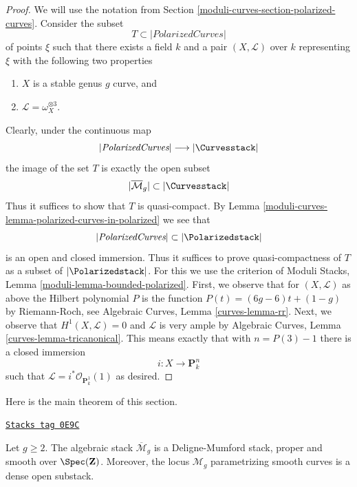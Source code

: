 \begin{proof}
We will use the notation from Section \ref{moduli-curves-section-polarized-curves}.
Consider the subset
$$
T \subset |\textit{PolarizedCurves}|
$$
of points $\xi$ such that there exists a field $k$ and a pair
$(X, \mathcal{L})$ over $k$ representing $\xi$
with the following two properties
\begin{enumerate}
\item $X$ is a stable genus $g$ curve, and
\item $\mathcal{L} = \omega_X^{\otimes 3}$.
\end{enumerate}
Clearly, under the continuous map
$$
|\textit{PolarizedCurves}|
\longrightarrow
|\Curvesstack|
$$
the image of the set $T$ is exactly the open subset
$$
|\overline{\mathcal{M}}_g| \subset |\Curvesstack|
$$
Thus it suffices to show that $T$ is quasi-compact.
By Lemma \ref{moduli-curves-lemma-polarized-curves-in-polarized} we see that
$$
|\textit{PolarizedCurves}| \subset |\Polarizedstack|
$$
is an open and closed immersion. Thus it suffices to
prove quasi-compactness of $T$ as a subset of
$|\Polarizedstack|$. For this we use the criterion of
Moduli Stacks, Lemma \ref{moduli-lemma-bounded-polarized}.
First, we observe that for $(X, \mathcal{L})$
as above the Hilbert polynomial $P$ is the function
$P(t) = (6g - 6)t + (1 - g)$ by Riemann-Roch, see
Algebraic Curves, Lemma \ref{curves-lemma-rr}.
Next, we observe that $H^1(X, \mathcal{L}) = 0$
and $\mathcal{L}$ is very ample by
Algebraic Curves, Lemma \ref{curves-lemma-tricanonical}.
This means exactly that with $n = P(3) - 1$
there is a closed immersion
$$
i : X \longrightarrow \mathbf{P}^n_k
$$
such that $\mathcal{L} = i^*\mathcal{O}_{\mathbf{P}^1_k}(1)$
as desired.
\end{proof}

Here is the main theorem of this section.

\begin{theorem}
\label{moduli-curves-theorem-stable-smooth-proper}
\href{https://stacks.math.columbia.edu/tag/0E9C}{\texttt{Stacks tag 0E9C}}

Let $g \geq 2$. The algebraic stack $\overline{\mathcal{M}}_g$ is a
Deligne-Mumford stack, proper and smooth over $\Spec(\mathbf{Z})$.
Moreover, the locus $\mathcal{M}_g$ parametrizing smooth curves
is a dense open substack.
\end{theorem}

